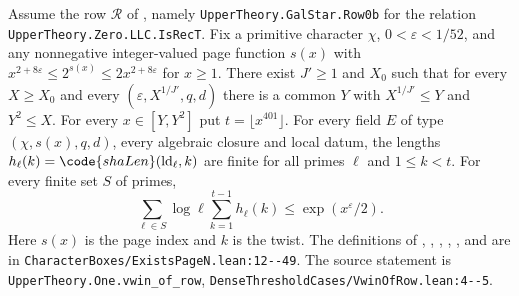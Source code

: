 \begin{proposition}
Assume the row $\mathcal R$ of , namely
\nolinkurl{UpperTheory.GalStar.Row0b} for the relation
\nolinkurl{UpperTheory.Zero.LLC.IsRecT}. Fix a primitive character $\chi$,
$0<\varepsilon<1/52$, and any nonnegative integer-valued page function $s(x)$ with
$x^{2+8\varepsilon}\le 2^{s(x)}\le 2x^{2+8\varepsilon}$ for $x\ge1$.
There exist $J'\ge1$ and $X_0$ such that for every $X\ge X_0$ and
every  $(\varepsilon,X^{1/J'},q,d)$ there is a common $Y$
with $X^{1/J'}\le Y$ and $Y^2\le X$. For every $x\in[Y,Y^2]$ put
$t=\lfloor x^{401}\rfloor$. For every field
$E$ of type $(\chi,s(x),q,d)$, every algebraic closure
and local datum, the lengths $h_\ell(k)=\code{shaLen}(\mathrm{ld}_\ell,k)$
are finite for all primes $\ell$ and $1\le k<t$. For every finite set
$S$ of primes,
\[
 \sum_{\ell\in S}\log\ell\sum_{k=1}^{t-1} h_\ell(k)
 \le \exp(x^\varepsilon/2).
\]
Here $s(x)$ is the page index and $k$ is the twist. The definitions of
, , , ,
,  and  are in
\nolinkurl{CharacterBoxes/ExistsPageN.lean:12--49}. The source
statement is \nolinkurl{UpperTheory.One.vwin_of_row},
\nolinkurl{DenseThresholdCases/VwinOfRow.lean:4--5}.
\end{proposition}


